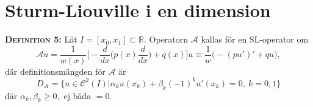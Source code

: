 \documentclass{article}
\begin{document}
\section{Sturm-Liouville i en dimension}
\textbf{\textsc{Definition 5:}} Låt $I=[x_0,x_1]\subset\mathbb{R}$. Operatorn $\mathcal{A}$ kallas för en SL-operator om
\begin{equation}
    \mathcal{A}u=\frac{1}{w(x)}\Big[-\frac{d}{dx}\Big(p(x)\frac{d}{dx}\Big)+q(x)\Big]u\equiv \frac{1}{w}\Big(-(pu')'+qu\Big),
\end{equation}
där definitionsmängden för $\mathcal{A}$ är
\begin{equation}
    D_{\mathcal{A}}=\{u\in \mathcal{C}^2(I)|\alpha_ku(x_k)+\beta_k(-1)^ku'(x_k)=0, \ k=0,1\}
\end{equation}
där $\alpha_k,\beta_k\geq 0,$ ej båda $=0$.\\ \\ 
\end{document}
